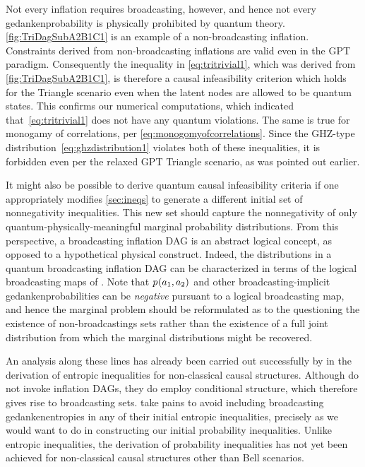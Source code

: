 Not every inflation requires broadcasting, however, and hence not every gedankenprobability is physically prohibited by quantum theory. 
\cref{fig:TriDagSubA2B1C1} is an example of a non-broadcasting inflation.
Constraints derived from non-broadcasting inflations are valid even in the GPT paradigm. Consequently the inequality in \cref{eq:tritrivial1}, which was derived from \cref{fig:TriDagSubA2B1C1}, is therefore a causal infeasibility criterion which holds for the Triangle scenario even when the latent nodes are allowed to be quantum states. This confirms our numerical computations, which indicated that~\eqref{eq:tritrivial1} does not have any quantum violations. The same is true for monogamy of correlations, per \cref{eq:monogomyofcorrelations}. Since the GHZ-type distribution~\cref{eq:ghzdistribution1} violates both of these inequalities, it is forbidden even per the relaxed GPT Triangle scenario, as was pointed out earlier. 

It might also be possible to derive quantum causal infeasibility criteria if one appropriately modifies \cref{sec:ineqs} to generate a different initial set of nonnegativity inequalities. This new set should capture the nonnegativity of only quantum-physically-meaningful marginal probability distributions. From this perspective, a broadcasting inflation DAG is an abstract logical concept, as opposed to a hypothetical physical construct. Indeed, the distributions in a quantum broadcasting inflation DAG can be characterized in terms of the logical broadcasting maps of \citet{Coecke2011}. Note that ${p_{}}\lparen a_1,a_2\rparen$ and other broadcasting-implicit gedankenprobabilities can be \emph{negative} pursuant to a logical broadcasting map, and hence the marginal problem should be reformulated as to the questioning the existence of non-broadcastings sets rather than the existence of a full joint distribution from which the marginal distributions might be recovered.

An analysis along these lines has already been carried out successfully by \citet{Chaves2015infoquantum} in the derivation of entropic inequalities for non-classical causal structures. Although \citet{Chaves2015infoquantum} do not invoke inflation DAGs, they do employ conditional structure, which therefore gives rise to broadcasting sets. \citet{Chaves2015infoquantum} take pains to avoid including broadcasting gedankenentropies in any of their initial entropic inequalities, precisely as we would want to do in constructing our initial probability inequalities. Unlike entropic inequalities, the derivation of probability inequalities has not yet been achieved for non-classical causal structures other than Bell scenarios. 

